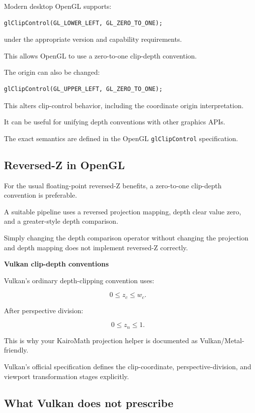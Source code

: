 Modern desktop OpenGL supports:

\begin{verbatim}
glClipControl(GL_LOWER_LEFT, GL_ZERO_TO_ONE);
\end{verbatim}

under the appropriate version and capability requirements.

This allows OpenGL to use a zero-to-one clip-depth convention.

The origin can also be changed:

\begin{verbatim}
glClipControl(GL_UPPER_LEFT, GL_ZERO_TO_ONE);
\end{verbatim}

This alters clip-control behavior, including the coordinate origin interpretation.

It can be useful for unifying depth conventions with other graphics APIs.

The exact semantics are defined in the OpenGL \texttt{glClipControl} specification. 

\subsection{Reversed-Z in OpenGL}\label{02-foundations-ii-ch033-reversed-z-in-opengl}

For the usual floating-point reversed-Z benefits, a zero-to-one clip-depth convention is preferable.

A suitable pipeline uses a reversed projection mapping, depth clear value zero, and a greater-style depth comparison.

Simply changing the depth comparison operator without changing the projection and depth mapping does not implement reversed-Z correctly.

\textbf{Vulkan clip-depth conventions}

Vulkan's ordinary depth-clipping convention uses:

\[
 \boxed{ 0\le z_c\le w_c }.
\]

After perspective division:

\[
 \boxed{ 0\le z_n\le1 }.
\]

This is why your KairoMath projection helper is documented as Vulkan/Metal-friendly.

Vulkan's official specification defines the clip-coordinate, perspective-division, and viewport transformation stages explicitly. 

\subsection{What Vulkan does not prescribe}\label{02-foundations-ii-ch033-what-vulkan-does-not-prescribe}

